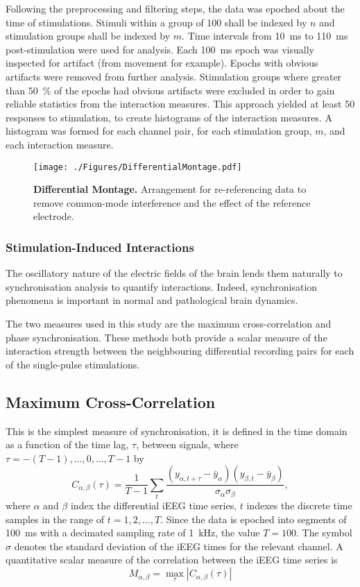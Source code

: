 \documentclass[]{article}
\begin{document}
Following the preprocessing and filtering steps, the data was epoched about the time of stimulations. Stimuli within a group of 100 shall be indexed by $n$ and stimulation groups shall be indexed by $m$. Time intervals from 10~ms to 110~ms post-stimulation were used for analysis. Each 100~ms epoch was visually inspected for artifact (from movement for example). Epochs with obvious artifacts were removed from further analysis. Stimulation groups where greater than 50~\% of the epochs had obvious artifacts were excluded in order to gain reliable statistics from the interaction measures. This approach yielded at least 50 responses to stimulation, to create histograms of the interaction measures. A histogram was formed for each channel pair, for each stimulation group, $m$, and each interaction measure. 

\begin{figure}[htbp]
	\centering
		\texttt{[image: ./Figures/DifferentialMontage.pdf]}
	\caption{\textbf{Differential Montage.} Arrangement for re-referencing data to remove common-mode interference and the effect of the reference electrode.}
	\label{fig:DifMontage}
\end{figure}

\subsubsection{Stimulation-Induced Interactions}

The oscillatory nature of the electric fields of the brain lends them naturally to synchronisation analysis to quantify interactions. Indeed, synchronisation phenomena is important in normal and pathological brain dynamics.

The two measures used in this study are the maximum cross-correlation and phase synchronisation. These methods both provide a scalar measure of the interaction strength between the neighbouring differential recording pairs for each of the single-pulse stimulations. 

\subsection{Maximum Cross-Correlation}
This is the simplest measure of synchronisation, it is defined in
the time domain as a function of the time lag, $\tau$, between signals, where $\tau =
-(T-1),\hdots,0,\hdots,T-1$ by
\begin{equation}
	C_{\alpha,\beta}\left(\tau\right) = \frac{1}{T-1} \sum_t\frac{( y_{\alpha,t+\tau}-\bar{y}_{\alpha}) (y_{\beta,t} - \bar{y}_{\beta})}{\sigma_{\alpha}\sigma_{\beta}},
\end{equation}
where $\alpha$ and $\beta$ index the differential iEEG time series, $t$ indexes the discrete time samples in the range of $t=1,2,\hdots,T$. Since the data is epoched into segments of 100~ms with a decimated sampling rate of 1~kHz, the value $T=100$. The symbol $\sigma$ denotes the standard deviation of the iEEG times for the relevant channel. A quantitative scalar measure of the correlation between the iEEG time series is
\begin{equation}
	M_{\alpha,\beta} = \max_\tau\left|C_{\alpha,\beta}(\tau)\right|
\end{equation}
\end{document}

